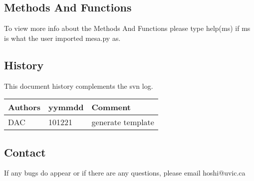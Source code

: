 \subsection{Methods And Functions}
To view more info about the Methods And Functions please type help(ms) if ms is what
the user imported mesa.py as.
		
\subsection{History} 
This document history complements the svn log.

\begin{tabular*}{\textwidth}{lll}
\hline
Authors & yymmdd & Comment \\
\hline
DAC & 101221 & generate template \\

\hline
\end{tabular*}


\subsection{Contact}
If any bugs do appear or if there are any questions, please email hoshi@uvic.ca
\begin{verbatim}

\end{verbatim}


%
%
%
%
